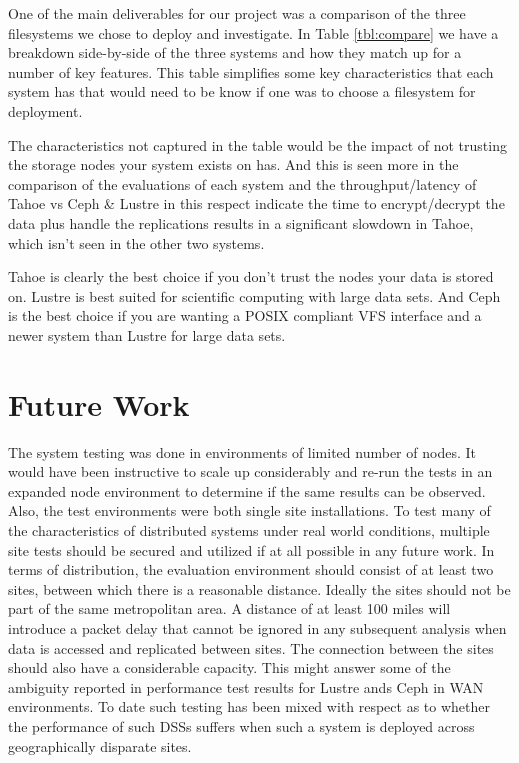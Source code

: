 \documentclass[11pt]{article}
\begin{document}
One of the main deliverables for our project was a comparison of the three filesystems we chose to deploy and investigate. In Table \ref{tbl:compare} we have a breakdown side-by-side of the three systems and how they match up for a number of key features. This table simplifies some key characteristics that each system has that would need to be know if one was to choose a filesystem for deployment. 

The characteristics not captured in the table would be the impact of not trusting the storage nodes your system exists on has. And this is seen more in the comparison of the evaluations of each system and the throughput/latency of Tahoe vs Ceph \& Lustre in this respect indicate the time to encrypt/decrypt the data plus handle the replications results in a significant slowdown in Tahoe, which isn't seen in the other two systems. 

Tahoe is clearly the best choice if you don't trust the nodes your data is stored on. Lustre is best suited for scientific computing with large data sets. And Ceph is the best choice if you are wanting a POSIX compliant VFS interface and a newer system than Lustre for large data sets. 

\section{Future Work}

The system testing was done in environments of limited number of 
nodes. It would have been instructive to scale up considerably and 
re-run the tests in an expanded node environment to determine if 
the same results can be observed. Also, the test environments were 
both single site installations. To test many of the characteristics 
of distributed systems under real world conditions, multiple site 
tests should be secured and utilized if at all possible in any future 
work. In terms of distribution, the evaluation environment should 
consist of at least two sites, between which there is a reasonable 
distance. Ideally the sites should not be part of the same 
metropolitan area. A distance of at least 100 miles will introduce 
a packet delay that cannot be ignored in any subsequent analysis when
data is accessed and replicated between sites. The connection between 
the sites should also have a considerable capacity. This might answer 
some of the ambiguity reported in performance test results for Lustre 
ands Ceph in WAN environments. To date such testing has been mixed with 
respect as to whether the performance of such DSSs suffers when such a 
system is deployed across geographically disparate sites. 
\end{document}

